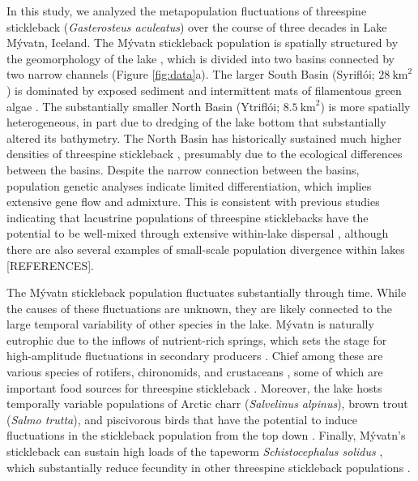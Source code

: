 \documentclass[11pt]{article}
\begin{document}
In this study, 
we analyzed the metapopulation fluctuations of threespine stickleback 
(\textit{Gasterosteus aculeatus})
over the course of three decades in Lake M\'{y}vatn, Iceland.
The M\'{y}vatn stickleback population is spatially structured by the geomorphology
of the lake \citep{gislason1998, millet2013}, 
which is divided into two basins connected by two narrow channels 
(Figure \ref{fig:data}a).
The larger South Basin (Sy{\dh}rifl\'{o}i; $28~\text{km}^2$)  
is dominated by exposed sediment and intermittent mats of filamentous green algae
\citep{einarsson2004myvatn}.
The substantially smaller North Basin (Ytrifl\'{o}i; $8.5~\text{km}^2$) 
is more spatially heterogeneous, 
in part due to dredging of the lake bottom
that substantially altered its bathymetry.
The North Basin has historically sustained much higher
densities of threespine stickleback  \citep{gislason1998}, 
presumably due to the ecological differences between the basins. 
Despite the narrow connection between the basins, 
population genetic \citep{millet2013} 
analyses indicate limited differentiation,
which implies extensive gene flow and admixture.
This is consistent with previous studies indicating that lacustrine populations
of threespine sticklebacks have the potential to be  
well-mixed through extensive within-lake dispersal
\citep{bolnick2009phenotype},
although there are also several examples of small-scale population divergence
within lakes [REFERENCES].

The M\'{y}vatn stickleback population fluctuates substantially through time.
While the causes of these fluctuations are unknown, 
they are likely connected to the large temporal variability 
of other species in the lake.
M\'{y}vatn is naturally eutrophic due to the inflows of nutrient-rich springs,
which sets the stage for high-amplitude fluctuations in secondary producers
\citep{einarsson2004myvatn}.
Chief among these are various species of rotifers, chironomids, and crustaceans
\citep{einarsson2002, einarsson2004clad, gardarsson2004population, ives2008},
some of which are important food sources for threespine stickleback
\citep{gudmundsson1996}.
Moreover, the lake hosts temporally variable populations 
of Arctic charr (\textit{Salvelinus alpinus}), 
brown trout (\textit{Salmo trutta}), 
and piscivorous birds that have the potential 
to induce fluctuations in the stickleback population from the top down
\citep{gardarsson1979waterfowl, gudbergsson2004}.
Finally, M\'{y}vatn's stickleback can sustain high loads of the tapeworm
\textit{Schistocephalus solidus} \citep{gislason1998, karvonen2013},
which substantially reduce fecundity in other threespine stickleback populations 
\citep{heins2010evolutionary, heins2012fecundity}.
\end{document}

